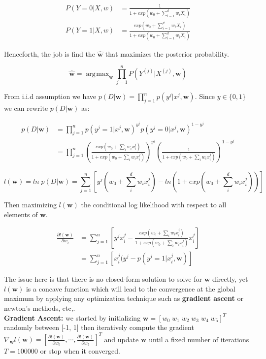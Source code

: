 \documentclass[a4paper]{article}
\DeclareMathOperator*{\argmax}{\arg\!\max}
\begin{document}
	\begin{align}
		P(Y=0|X,w) &= \frac{1}{1+exp(w_0 + \sum_{i=1}^{d} w_iX_i)} \\ 
		P(Y=1|X,w) &= \frac{exp(w_0 + \sum_{i=1}^{d} w_iX_i)}{1+exp(w_0 + \sum_{i=1}^{d} w_iX_i)}
	\end{align}
	
	Henceforth, the job is find the $\hat{\mathbf{w}}$ that maximizes the posterior probability.
	
	\begin{equation}
		\hat{\mathbf{w}} = \argmax_{\mathbf{w}} \prod_{j=1}^n P(Y^{(j)}|X^{(j)},\mathbf{w})
	\end{equation}
	
	From i.i.d assumption we have $p(D|\mathbf{w}) = \prod_{j=1}^{n} p(y^j|x^j,\mathbf{w})$. Since $y \in \{0, 1\}$ we can rewrite $p(D|\mathbf{w})$ as:
	
	\begin{align}
		p(D|\mathbf{w}) &= \prod_{j=1}^n p(y^j=1|x^j,\mathbf{w})^{y^j}p(y^j=0|x^j,\mathbf{w})^{1-y^j} \\ 
			&= \prod_{j=1}^n \left(\frac{exp(w_0+\sum_i w_ix_i^j)}{1+exp(w_0+\sum_i w_ix_i^j)}\right)^{y^j}\left(\frac{1}{1+exp(w_0+\sum_i w_ix_i^j)}\right)^{1-y^j}
	\end{align}
	
	\begin{equation}
		l(\mathbf{w}) = ln\;p(D|\mathbf{w}) = \sum_{j=1}^n \left[y^j(w_0+\sum_i^d w_ix_i^j)-ln(1+exp(w_0+\sum_i^d w_ix_i^j))\right]
	\end{equation}
	
	Then maximizing $l(\mathbf{w})$ the conditional log likelihood with respect to all elements of $\mathbf{w}$.
	
	\begin{align}
		\frac{\partial l(\mathbf{w})}{\partial w_i} &= \sum_{j=1}^n \left[y^jx_i^j - \frac{exp(w_0+\sum_i w_ix_i^j)}{1+exp(w_0+\sum_i w_ix_i^j)}x_i^j\right] \\ 
			&= \sum_{j=1}^n \left[x_i^j(y^j - p(y^j=1|x_i^j, \mathbf{w})\right]
	\end{align}
	
	The issue here is that there is no closed-form solution to solve for $\mathbf{w}$ directly, yet $l(\mathbf{w})$ is a concave function which will lead to the convergence at the global maximum by applying any optimization technique such as \textbf{gradient ascent} or newton's methods, etc,. \\
	
	\textbf{Gradient Ascent: } we started by initializing $\mathbf{w} = [w_0\; w_1\; w_2\; w_3\; w_4\; w_5]^T$ randomly between [-1, 1] then iteratively compute the gradient 
	$ \nabla_{\mathbf{w}} l(\mathbf{w}) = \left[
		\frac{\partial l(\mathbf{w})}{\partial w_0}, \cdots, 
		\frac{\partial l(\mathbf{w})}{\partial w_5}
	\right]^T$ and update $\mathbf{w}$ until a fixed number of iterations $T = 100000$ or stop when it converged.
	
\end{document}
